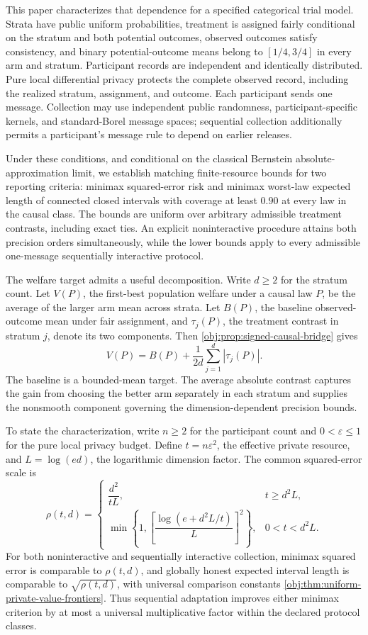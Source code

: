 \documentclass[11pt]{article}
\begin{document}
This paper characterizes that dependence for a specified categorical trial model. Strata have public uniform probabilities, treatment is assigned fairly conditional on the stratum and both potential outcomes, observed outcomes satisfy consistency, and binary potential-outcome means belong to \([1/4,3/4]\) in every arm and stratum. Participant records are independent and identically distributed. Pure local differential privacy protects the complete observed record, including the realized stratum, assignment, and outcome. Each participant sends one message. Collection may use independent public randomness, participant-specific kernels, and standard-Borel message spaces; sequential collection additionally permits a participant's message rule to depend on earlier releases.

Under these conditions, and conditional on the classical Bernstein absolute-approximation limit, we establish matching finite-resource bounds for two reporting criteria: minimax squared-error risk and minimax worst-law expected length of connected closed intervals with coverage at least \(0.90\) at every law in the causal class. The bounds are uniform over arbitrary admissible treatment contrasts, including exact ties. An explicit noninteractive procedure attains both precision orders simultaneously, while the lower bounds apply to every admissible one-message sequentially interactive protocol.

The welfare target admits a useful decomposition. Write \(d\ge2\) for the stratum count. Let \(V(P)\), the first-best population welfare under a causal law \(P\), be the average of the larger arm mean across strata. Let \(B(P)\), the baseline observed-outcome mean under fair assignment, and \(\tau_j(P)\), the treatment contrast in stratum \(j\), denote its two components. Then \cref{obj:prop:signed-causal-bridge} gives
\[
V(P)=B(P)+\frac{1}{2d}\sum_{j=1}^d|\tau_j(P)|.
\]
The baseline is a bounded-mean target. The average absolute contrast captures the gain from choosing the better arm separately in each stratum and supplies the nonsmooth component governing the dimension-dependent precision bounds.

To state the characterization, write \(n\ge2\) for the participant count and \(0<\varepsilon\le1\) for the pure local privacy budget. Define \(t=n\varepsilon^2\), the effective private resource, and \(L=\log(ed)\), the logarithmic dimension factor. The common squared-error scale is
\[
\rho(t,d)=
\begin{cases}
\dfrac{d^2}{tL},&t\ge d^2L,\\[5pt]
\displaystyle\min\left\{1,
\left[\dfrac{\log(e+d^2L/t)}{L}\right]^2\right\},
&0<t<d^2L.
\end{cases}
\]
For both noninteractive and sequentially interactive collection, minimax squared error is comparable to \(\rho(t,d)\), and globally honest expected interval length is comparable to \(\sqrt{\rho(t,d)}\), with universal comparison constants \cref{obj:thm:uniform-private-value-frontiers}. Thus sequential adaptation improves either minimax criterion by at most a universal multiplicative factor within the declared protocol classes.
\end{document}
